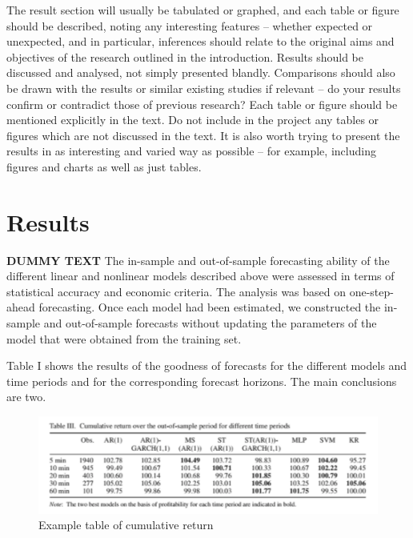 The result section will usually be tabulated or graphed, and each table or figure should be described, noting any interesting features – whether expected or unexpected, and in particular, inferences should relate to the original aims and objectives of the research outlined in the introduction. Results should be discussed and analysed, not simply presented blandly. Comparisons should also be drawn with the results or similar existing studies if relevant – do your results confirm or contradict those of previous research? Each table or figure should be mentioned explicitly in the text. Do not include in the project any tables or figures which are not discussed in the text. It is also worth trying to present the results in as interesting and varied way as possible – for example, including figures and charts as well as just tables.


\chapter{Results}

\textbf{DUMMY TEXT}
The in-sample and out-of-sample forecasting ability of the different linear and nonlinear models described above were assessed in terms of statistical accuracy and economic criteria. The analysis was based on one-step-ahead forecasting. Once each model had been estimated, we constructed the in-sample and out-of-sample forecasts without updating the parameters of the model that were
obtained from the training set.

Table I shows the results of the goodness of forecasts for the different models and time periods and
for the corresponding forecast horizons. The main conclusions are two.


\begin{figure}
    \centering
    \includegraphics{Pictures/cumret.png}
    \caption{Example table of cumulative return}
    \label{fig:my_label}
\end{figure}

